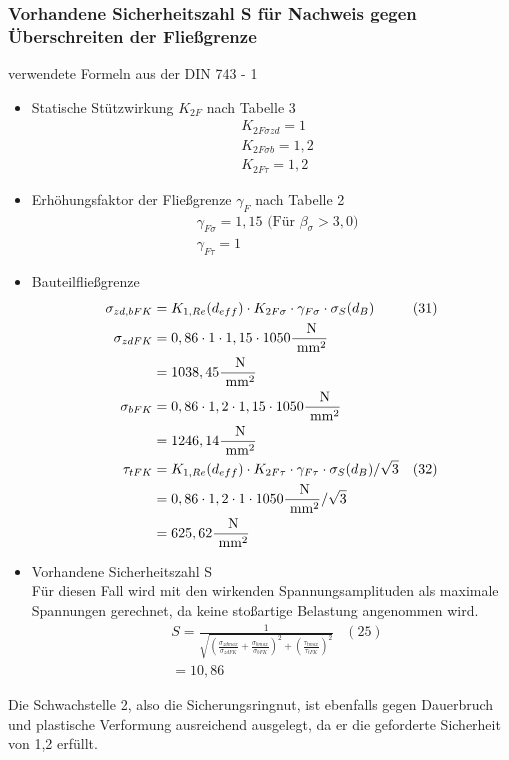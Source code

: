 \subsubsection{Vorhandene Sicherheitszahl S für Nachweis gegen Überschreiten der Fließgrenze}
verwendete Formeln aus der DIN 743 - 1
\begin{itemize}
\item Statische Stützwirkung $K_{2F}$ nach Tabelle 3
	\begin{align*}
	&K_{2F \sigma zd} = 1 \\
	&K_{2F \sigma b} = 1,2 \\
	&K_{2F \tau} = 1,2 
	\end{align*}
\item Erhöhungsfaktor der Fließgrenze $\gamma_{F}$ nach Tabelle 2
	\begin{align*}
	&\gamma_{F\sigma} = 1,15 \text{ (Für } \beta_{\sigma} > 3,0 \text{)} \\
	&\gamma_{F\tau} = 1 
	\end{align*}
\item Bauteilfließgrenze
	\begin{align*}
	\sigma_{zd,bFK} &= K_{1,Re} (d_{eff}) \cdot K_{2F \sigma} \cdot \gamma_{F\sigma} \cdot \sigma_S (d_B) & (31) \\
	\sigma_{zdFK}&= 0,86 \cdot 1 \cdot 1,15 \cdot 1050 \frac{\text{ N}}{\text{ mm}^2} \\
	&= 1038,45 \frac{\text{ N}}{\text{ mm}^2}\\
	\sigma_{bFK}&= 0,86 \cdot 1,2 \cdot 1,15 \cdot 1050 \frac{\text{ N}}{\text{ mm}^2} \\
	&= 1246,14\frac{\text{ N}}{\text{ mm}^2}\\
	\tau_{tFK} &= K_{1,Re} (d_{eff}) \cdot K_{2F \tau} \cdot \gamma_{F\tau} \cdot \sigma_S (d_B) / \sqrt{3} &(32) \\
	&= 0,86 \cdot 1,2 \cdot 1 \cdot 1050 \frac{\text{ N}}{\text{ mm}^2} / \sqrt{3}\\
	&= 625,62 \frac{\text{ N}}{\text{ mm}^2}
	\end{align*}
	\newpage
\item Vorhandene Sicherheitszahl S \\
	Für diesen Fall wird mit den wirkenden Spannungsamplituden als maximale Spannungen gerechnet, da keine stoßartige Belastung angenommen wird. 
	\begin{align*}
	&S = \frac{1}{\sqrt{\left( \frac{\sigma_{zdmax}}{\sigma_{zdFK}}+\frac{\sigma_{bmax}}{\sigma_{bFK}} \right)^2 +\left( \frac{\tau_{tmax}}{\tau_{tFK}} \right)^2 }} & (25)\\
	&= 10,86 
	\end{align*}
\end{itemize}
Die Schwachstelle 2, also die Sicherungsringnut, ist ebenfalls gegen Dauerbruch und plastische Verformung ausreichend ausgelegt, da er die geforderte Sicherheit von 1,2 erfüllt.